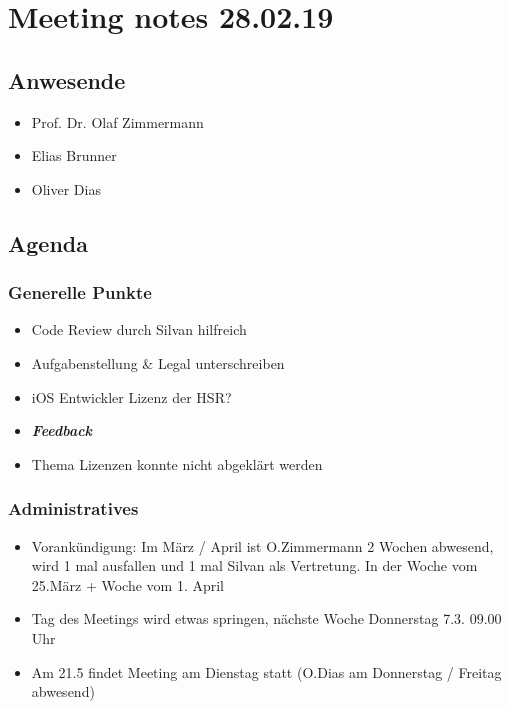 \hypertarget{meeting-notes-280219}{%
\section*{Meeting notes 28.02.19}\label{meeting-notes-280219}}

\hypertarget{anwesende}{%
\subsection*{Anwesende}\label{anwesende}}

\begin{itemize}

\item
  Prof. Dr. Olaf Zimmermann
\item
  Elias Brunner
\item
  Oliver Dias
\end{itemize}

\hypertarget{agenda}{%
\subsection*{Agenda}\label{agenda}}

\hypertarget{generelle-punkte}{%
\subsubsection*{Generelle Punkte}\label{generelle-punkte}}

\begin{itemize}

\item
  Code Review durch Silvan hilfreich
\item
  Aufgabenstellung \& Legal unterschreiben
\item
  iOS Entwickler Lizenz der HSR? 
\item \emph{\textbf{Feedback}}
\item
  Thema Lizenzen konnte nicht abgeklärt werden
\end{itemize}

\hypertarget{administratives}{%
\subsubsection*{Administratives}\label{administratives}}

\begin{itemize}

\item
  Vorankündigung: Im März / April ist O.Zimmermann 2 Wochen abwesend,
  wird 1 mal ausfallen und 1 mal Silvan als Vertretung. In der Woche vom
  25.März + Woche vom 1. April
\item
  Tag des Meetings wird etwas springen, nächste Woche Donnerstag 7.3.
  09.00 Uhr
\item
  Am 21.5 findet Meeting am Dienstag statt (O.Dias am Donnerstag /
  Freitag abwesend)
\end{itemize}

